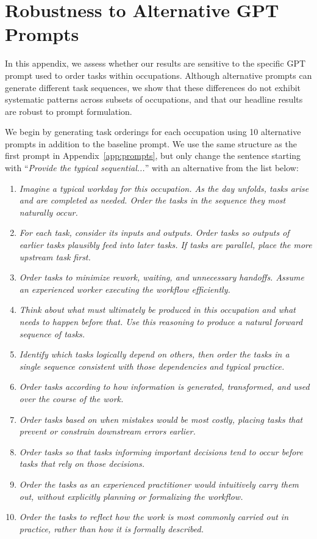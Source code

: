 \section{Robustness to Alternative GPT Prompts}
\label{app:gptPrompts_robustness}

In this appendix, we assess whether our results are sensitive to the specific GPT prompt used to order tasks within occupations.  
Although alternative prompts can generate different task sequences, we show that these differences do not exhibit systematic patterns across subsets of occupations, and that our headline results are robust to prompt formulation.

We begin by generating task orderings for each occupation using 10 alternative prompts in addition to the baseline prompt.
We use the same structure as the first prompt in Appendix~\ref{app:prompts}, but only change the sentence starting with ``\textit{Provide the typical sequential...}'' with an alternative from the list below:
\begin{enumerate}
    \item \small \textit{Imagine a typical workday for this occupation. As the day unfolds, tasks arise and are completed as needed. Order the tasks in the sequence they most naturally occur.}
    \item \small \textit{For each task, consider its inputs and outputs. Order tasks so outputs of earlier tasks plausibly feed into later tasks. If tasks are parallel, place the more upstream task first.}
    \item \small \textit{Order tasks to minimize rework, waiting, and unnecessary handoffs. Assume an experienced worker executing the workflow efficiently.}
    \item \small \textit{Think about what must ultimately be produced in this occupation and what needs to happen before that. Use this reasoning to produce a natural forward sequence of tasks.}
    \item \small \textit{Identify which tasks logically depend on others, then order the tasks in a single sequence consistent with those dependencies and typical practice.}
    \item \small \textit{Order tasks according to how information is generated, transformed, and used over the course of the work.}
    \item \small \textit{Order tasks based on when mistakes would be most costly, placing tasks that prevent or constrain downstream errors earlier.}
    \item \small \textit{Order tasks so that tasks informing important decisions tend to occur before tasks that rely on those decisions.}
    \item \small \textit{Order the tasks as an experienced practitioner would intuitively carry them out, without explicitly planning or formalizing the workflow.}
    \item \small \textit{Order the tasks to reflect how the work is most commonly carried out in practice, rather than how it is formally described.}
\end{enumerate}
